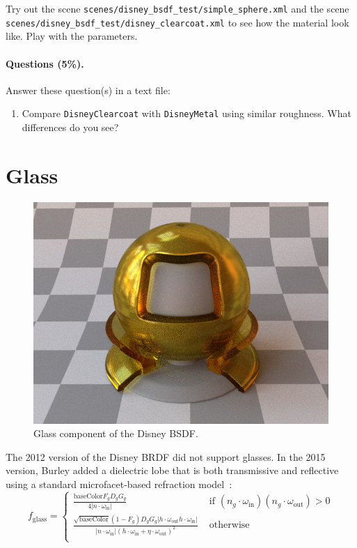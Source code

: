 Try out the scene \lstinline{scenes/disney_bsdf_test/simple_sphere.xml} and the scene \lstinline{scenes/disney_bsdf_test/disney_clearcoat.xml} to see how the material look like. Play with the parameters.

\paragraph{Questions (5\%).} Answer these question(s) in a text file:
\begin{enumerate}
	\item Compare \lstinline{DisneyClearcoat} with \lstinline{DisneyMetal} using similar roughness. What differences do you see?
\end{enumerate}

\section{Glass}
\begin{figure}
	\centering
	\includegraphics[width=0.5\linewidth]{imgs/disney_glass.png}
	\caption{Glass component of the Disney BSDF.}
\end{figure}

The 2012 version of the Disney BRDF did not support glasses. In the 2015 version, Burley added a dielectric lobe that is both transmissive and reflective using a standard microfacet-based refraction model~\cite{Walter:2007:MMR}:
\begin{equation}
f_{\text{glass}} = \begin{cases}
\frac{\text{baseColor} F_g D_g G_g}{4 |n \cdot \omega_{\text{in}}|} & \mbox{ if } \left(n_g \cdot \omega_{\text{in}}\right) \left(n_g \cdot \omega_{\text{out}}\right) > 0 \\
\frac{\sqrt{\text{baseColor}} (1 - F_g) D_g G_g \left|h \cdot \omega_{\text{out}} h \cdot \omega_{\text{in}} \right|}{
\left|n \cdot \omega_{\text{in}}\right| \left( h \cdot \omega_{\text{in}} + \eta \cdot \omega_{\text{out}} \right)^2} & \mbox{ otherwise}\\
\end{cases}
\label{eq:f_glass}
\end{equation}

